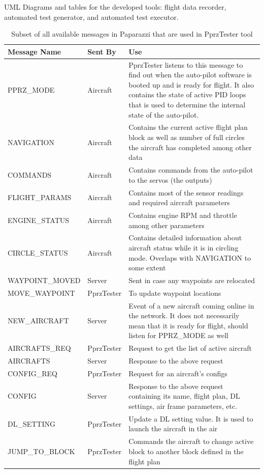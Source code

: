 UML Diagrams and tables for the developed tools: flight data recorder, automated test generator, and automated test executor.
\begin{table}
    \centering
\begin{longtable}{llp{}}
\toprule
\textbf{Message Name }   & \textbf{Sent By }    & \textbf{Use}                                                                     \\ \hline
\endhead
%
\hline
\endfoot
%
\endlastfoot
%
PPRZ\_MODE &
  Aircraft &
  PprzTester listens to this message to find out when the auto-pilot software is booted up and is ready for flight. It also contains the state of active PID loops that is used to determine the internal state of the auto-pilot. \\
NAVIGATION &
  Aircraft &
  Contains the current active flight plan block as well as number of full circles the aircraft has completed among other data \\
COMMANDS        & Aircraft    & Contains commands from the auto-pilot to the servos (the outputs)       \\
FLIGHT\_PARAMS  & Aircraft    & Contains most of the sensor readings and required aircraft parameters   \\
ENGINE\_STATUS  & Aircraft    & Contains engine RPM and throttle among other parameters                 \\
CIRCLE\_STATUS &
  Aircraft &
  Contains detailed information about aircraft status while it is in circling mode. Overlaps with NAVIGATION to some extent \\
WAYPOINT\_MOVED & Server      & Sent in case any waypoints are relocated                                \\
MOVE\_WAYPOINT  & PprzTester & To update waypoint locations                                            \\
NEW\_AIRCRAFT &
  Server &
  Event of a new aircraft coming online in the network. It does not necessarily mean that it is ready for flight, should listen for PPRZ\_MODE as well \\
AIRCRAFTS\_REQ  & PprzTester & Request to get the list of active aircraft                              \\
AIRCRAFTS       & Server      & Response to the above request                                           \\
CONFIG\_REQ     & PprzTester & Request for an aircraft's configs                                       \\
CONFIG &
  Server &
  Response to the above request containing  its name, flight plan, DL settings, air frame parameters, etc. \\
DL\_SETTING     & PprzTester & Update a DL setting value. It is used to launch the aircraft in the air \\
JUMP\_TO\_BLOCK & PprzTester & Commands the aircraft to change active block to another block defined in the flight plan  \\ \bottomrule
\end{longtable}
\caption{Subset of all available messages in Paparazzi that are used in PprzTester tool}
\label{tab:pprz_messages}
\end{table}

